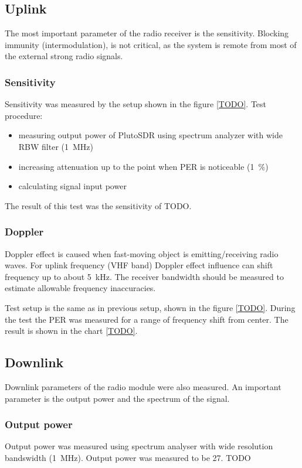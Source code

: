 \subsection{Uplink}
The most important parameter of the radio receiver is the sensitivity. Blocking immunity (intermodulation), is not critical, as the system is remote from most of the external strong radio signals.

\subsubsection{Sensitivity}
Sensitivity was measured by the setup shown in the figure \ref{TODO}. Test procedure:
\begin{itemize}
    \item measuring output power of PlutoSDR using spectrum analyzer with wide RBW filter (\SI{1}{\MHz})
    \item increasing attenuation up to the point when PER is noticeable (\SI{1}{\percent})
    \item calculating signal input power
\end{itemize}

The result of this test was the sensitivity of TODO.

\subsubsection{Doppler}
Doppler effect is caused when fast-moving object is emitting/receiving radio waves. For uplink frequency (VHF band) Doppler effect influence can shift frequency up to about \SI{5}{\kHz}. The receiver bandwidth should be measured to estimate allowable frequency inaccuracies.

Test setup is the same as in previous setup, shown in the figure \ref{TODO}. During the test the PER was measured for a range of frequency shift from center. The result is shown in the chart \ref{TODO}.


\subsection{Downlink}
Downlink parameters of the radio module were also measured. An important parameter is the output power and the spectrum of the signal.

\subsubsection{Output power}
Output power was measured using spectrum analyser with wide resolution bandswidth (\SI{1}{\MHz}). Output power was measured to be \SI{27}{\dBm}. TODO

